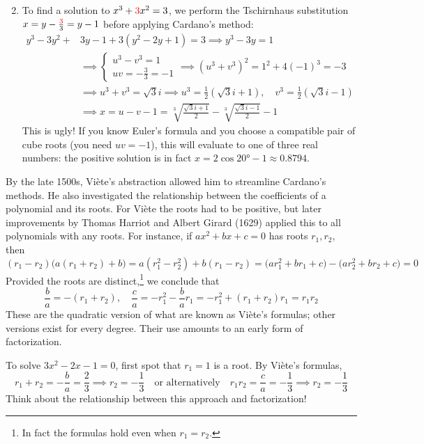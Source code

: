 \begin{enumerate}\setcounter{enumi}{1}
  \item To find a solution to $x^3+\textcolor{red}{3}x^2=3$, we perform the Tschirnhaus substitution $x=y-\frac{\textcolor{red}{3}}3=y-1$ before applying Cardano's method:
	\begin{align*}
		y^3-3y^2+&3y-1+3(y^2-2y+1)=3\implies y^3-3y=1 \tag{$b=-3$, $c=1$}\\
		&\implies
		\begin{cases}
			u^3-v^3=1\\
			uv=-\frac 33=-1
		\end{cases}
		\implies (u^3+v^3)^2=1^2+4(-1)^3=-3\\
		&\implies u^3+v^3=\sqrt 3i \implies u^3=\frac 12(\sqrt 3i+1),\quad v^3=\frac 12(\sqrt 3i-1)\\
		&\implies x=u-v-1=\sqrt[3]{\frac{\sqrt 3i+1}2}-\sqrt[3]{\frac{\sqrt 3i-1}2}-1 
	\end{align*}
	This is ugly! If you know Euler's formula and you choose a compatible pair of cube roots (you need $uv=-1$), this will evaluate to one of three real numbers: the positive solution is in fact $x=2\cos\ang{20}-1\approx 0.8794$.
\end{enumerate}

\goodbreak



By the late 1500s, Viète's abstraction allowed him to streamline Cardano's methods. He also investigated the relationship between the coefficients of a polynomial and its roots. For Viète the roots had to be positive, but later improvements by Thomas Harriot and Albert Girard (1629) applied this to all polynomials with any roots. For instance, if $ax^2+bx+c=0$ has roots $r_1,r_2$, then
\[
	(r_1-r_2)\bigl(a(r_1+r_2)+b\bigr) =a(r_1^2-r_2^2)+b(r_1-r_2)= \bigl(ar_1^2+br_1+c\bigr)-\bigl(ar_2^2+br_2+c\bigr) =0
\]
Provided the roots are distinct,\footnote{In fact the formulas hold even when $r_1=r_2$.} we conclude that
\[
	\frac ba=-(r_1+r_2),\quad
	\frac ca=-r_1^2-\frac bar_1=-r_1^2+(r_1+r_2)r_1=r_1r_2
\]
These are the quadratic version of what are known as Viète's formulas; other versions exist for every degree. Their use amounts to an early form of factorization.



To solve $3x^2-2x-1=0$, first spot that $r_1=1$ is a root. By Viète's formulas,
\[
	r_1+r_2=-\frac ba=\frac 23\implies r_2=-\frac 13
	\quad\text{or alternatively}\quad
	r_1r_2=\frac ca=-\frac 13\implies r_2=-\frac 13
\]
Think about the relationship between this approach and factorization!\medbreak

